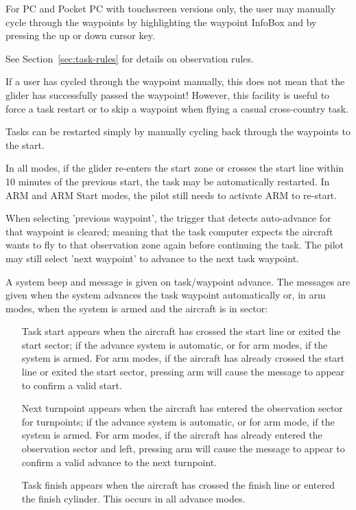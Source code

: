 \documentclass[a4paper,12pt]{refrep}
\newcommand{\InfoBox}[0]{{InfoBox}}
\begin{document}
For PC and Pocket PC with touchscreen versions only, the user may
manually cycle through the waypoints by highlighting the waypoint
{\InfoBox} and by pressing the up or down cursor key.

See Section~\ref{sec:task-rules} for details on observation rules.

If a user has cycled through the waypoint manually, this does not mean
that the glider has successfully passed the waypoint!  However, this
facility is useful to force a task restart or to skip a waypoint when
flying a casual cross-country task.

\tip Tasks can be restarted simply by manually cycling back through the
waypoints to the start.

In all modes, if the glider re-enters the start zone or crosses the
start line within 10 minutes of the previous start, the task may be
automatically restarted.  In ARM and ARM Start modes, the pilot still
needs to activate ARM to re-start.

When selecting 'previous waypoint', the trigger that detects
auto-advance for that waypoint is cleared; meaning that the task
computer expects the aircraft wants to fly to that observation zone
again before continuing the task.  The pilot may still select 'next
waypoint' to advance to the next task waypoint.

A system beep and message is given on task/waypoint advance.  The
messages are given when the system advances the task waypoint
automatically or, in arm modes, when the system is armed and the
aircraft is in sector:
\begin{itemize}
\item[Task start] appears when the aircraft has crossed the start line or
 exited the start sector; if the advance system is automatic, or for
 arm modes, if the system is armed.  For arm modes, if the aircraft
 has already crossed the start line or exited the start sector,
 pressing arm will cause the message to appear to confirm a valid
 start.
\item[Next turnpoint] appears when the aircraft has entered the observation
 sector for turnpoints; if the advance system is automatic, or for arm
 mode, if the system is armed.  For arm modes, if the aircraft has
 already entered the observation sector and left, pressing arm will
 cause the message to appear to confirm a valid advance to the next
 turnpoint.
\item[Task finish] appears when the aircraft has crossed the finish line
 or entered the finish cylinder.  This occurs in all advance modes. 
\end{itemize}
\end{document}
